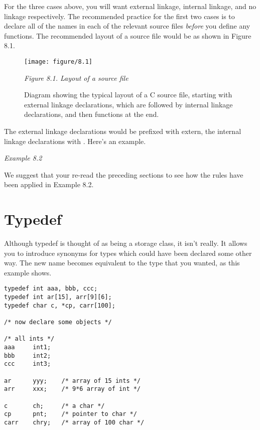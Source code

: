    For the three cases above, you will want external linkage, internal
    linkage, and no linkage respectively. The recommended practice for the
    first two cases is to declare all of the names in each of the relevant
    source files \textit{before} you define any functions. The recommended
    layout of a source file would be as shown in Figure 8.1.


    \begin{figure*}\centering
      \texttt{[image: figure/8.1]}
      \caption{Diagram showing the typical layout of a C source file, starting            with external linkage declarations, which are followed by internal            linkage declarations, and then functions at the end.}
\begin{center}\textit{Figure 8.1. Layout of a source file}\end{center}
    \end{figure*}



   The external linkage declarations would be prefixed with extern, the
    internal linkage declarations with \static. Here's an
    example.


    \begin{center}\textit{Example 8.2}\end{center}


   We suggest that your re-read the preceding sections to see how the
    rules have been applied in Example 8.2.


  

 
        \section{Typedef}
        

  

  Although typedef is thought of as being a storage class, it isn't
   really. It allows you to introduce synonyms for types which could have
   been declared some other way. The new name becomes equivalent to the type
   that you wanted, as this example shows.


\begin{Verbatim}
typedef int aaa, bbb, ccc;
typedef int ar[15], arr[9][6];
typedef char c, *cp, carr[100];

/* now declare some objects */

/* all ints */
aaa     int1;
bbb     int2;
ccc     int3;

ar      yyy;    /* array of 15 ints */
arr     xxx;    /* 9*6 array of int */

c       ch;     /* a char */
cp      pnt;    /* pointer to char */
carr    chry;   /* array of 100 char */
\end{Verbatim}

